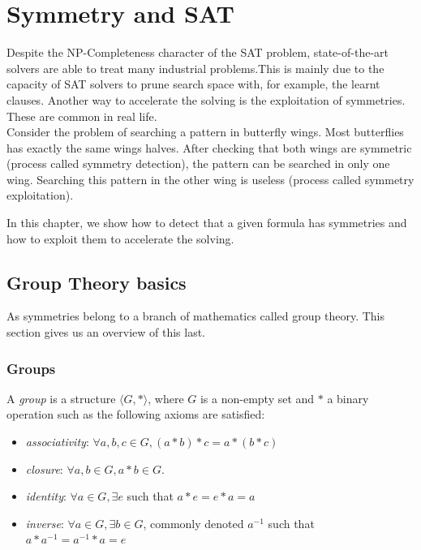\chapter{Symmetry and SAT}\label{chap:symmetryinsat}
\minitoc

Despite the NP-Completeness character of the SAT problem, state-of-the-art solvers are able to treat many industrial problems.This is mainly due to the capacity of SAT solvers to prune search space with, for example, the learnt clauses.
Another way to accelerate the solving is the exploitation of symmetries.
These are common in real life. \\
Consider the problem of searching a pattern in butterfly wings.
Most butterflies has exactly the same wings halves. After checking that both wings are symmetric
(process called symmetry detection), the pattern can be searched in only one wing. Searching this pattern in the other wing is useless (process called symmetry exploitation). 

In this chapter, we show how to detect that a given formula has symmetries and how to
exploit them to accelerate the solving.




\section{Group Theory basics}	
As symmetries belong to a branch of mathematics called group theory.
This section gives us an overview of this last.

\subsection{Groups}



\begin{definition}[Group]
	A \emph{group} is a structure $\langle G, * \rangle$, where $G$ is a non-empty set and $*$ a binary
	operation such as the following axioms are satisfied:
	\begin{itemize}[noitemsep,nolistsep]
		\item \emph{associativity}: $\forall a, b, c \in G, (a * b) * c = a * (b * c)$
		\item \emph{closure}: $\forall a, b \in G, a * b \in G$.
		\item \emph{identity}: $\forall a \in G, \exists e$ such that $ a * e = e * a = a$
		\item \emph{inverse}:  $\forall a \in G, \exists b \in G$, commonly denoted $a^{-1}$ such that
		$a * a^{-1} = a^{-1} * a = e$
	\end{itemize}
\end{definition}

